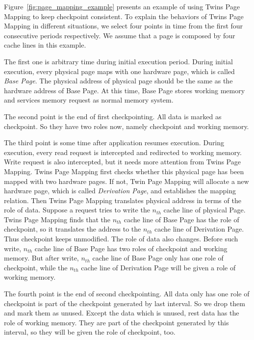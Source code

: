 \documentclass[conference]{IEEEtran}
\begin{document}
Figure~\ref{fig:page_mapping_example} presents an example of using Twins Page Mapping to keep checkpoint consistent.
To explain the behaviors of Twins Page Mapping in different situations, we select four points in time from the first four consecutive periods respectively.
We assume that a page is composed by four cache lines in this example.
\begin{enumerate*}
    \item
        The first one is arbitrary time during initial execution period.
        During initial execution, every physical page maps with one hardware page, which is called \textit{Base Page}.
        The physical address of physical page should be the same as the hardware address of Base Page.
        At this time, Base Page stores working memory and services memory request as normal memory system.
    \item
        The second point is the end of first checkpointing.
        All data is marked as checkpoint.
        So they have two roles now, namely checkpoint and working memory.
    \item
        The third point is some time after application resumes execution.
        During execution, every read request is intercepted and redirected to working memory.
        Write request is also intercepted, but it needs more attention from Twins Page Mapping.
        Twins Page Mapping first checks whether this physical page has been mapped with two hardware pages.
        If not, Twin Page Mapping will allocate a new hardware page, which is called \textit{Derivation Page}, and establishes the mapping relation.
        Then Twins Page Mapping translates physical address in terms of the role of data.
        Suppose a request tries to write the $n_{th}$ cache line of physical Page.
        Twins Page Mapping finds that the $n_{th}$ cache line of Base Page has the role of checkpoint, so it translates the address to the $n_{th}$ cache line of Derivation Page.
        Thus checkpoint keeps unmodified.
        The role of data also changes.
        Before such write, $n_{th}$ cache line of Base Page has two roles of checkpoint and working memory.
        But after write, $n_{th}$ cache line of Base Page only has one role of checkpoint, while the $n_{th}$ cache line of Derivation Page will be given a role of working memory.
    \item
        The fourth point is the end of second checkpointing.
        All data only has one role of checkpoint is part of the checkpoint generated by last interval.
        So we drop them and mark them as unused.
        Except the data which is unused, rest data has the role of working memory.
        They are part of the checkpoint generated by this interval, so they will be given the role of checkpoint, too.
\end{enumerate*}
\end{document}
